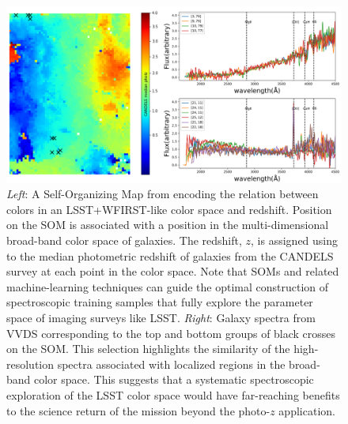 \documentclass[oneside,11pt]{amsart}
\begin{document}
\begin{figure}[h!]
%
\vskip -0.2in
%
\includegraphics[width=\textwidth]{figs/Hemmati18_Fig8_VVDS_spec.png}
%
\caption{\small {\it Left}: A Self-Organizing Map
\citep[SOM;][]{1990Natur.346...24K} from \citet{hemmati18} encoding the
relation between colors in an LSST+WFIRST-like color space and redshift.
Position on the SOM is associated with a position in the
multi-dimensional broad-band color space of galaxies.  The redshift,
$z$, is assigned using to the median photometric redshift of galaxies
from the CANDELS survey \citep{2011ApJS..197...35G} at each point in the
color space.  Note that SOMs and related machine-learning techniques can
guide the optimal construction of spectroscopic training samples that
fully explore the parameter space of imaging surveys like LSST.  {\it
Right}: Galaxy spectra from VVDS \citep{2005A&A...439..845L}
corresponding to the top and bottom groups of black crosses on the SOM.
This selection highlights the similarity of the high-resolution spectra
associated with localized regions in the broad-band color space. This
suggests that a systematic spectroscopic exploration of the LSST color
space would have far-reaching benefits to the science return of the
mission beyond the photo-$z$ application.}
%
\label{fig:SOM}
%
\end{figure}
\end{document}
